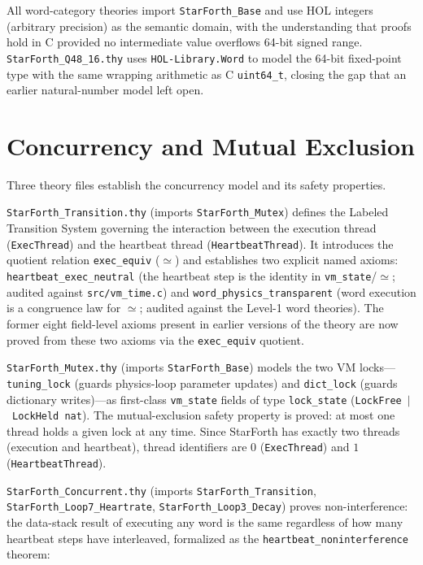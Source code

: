 All word-category theories import \texttt{StarForth\_Base} and use HOL
integers (arbitrary precision) as the semantic domain, with the understanding
that proofs hold in C provided no intermediate value overflows 64-bit signed
range. \texttt{StarForth\_Q48\_16.thy} uses \texttt{HOL-Library.Word} to model
the 64-bit fixed-point type with the same wrapping arithmetic as C
\texttt{uint64\_t}, closing the gap that an earlier natural-number model left
open.

\section{Concurrency and Mutual Exclusion}
\label{vol1:sec:proofs:concurrent}


Three theory files establish the concurrency model and its safety properties.

\texttt{StarForth\_Transition.thy} (imports \texttt{StarForth\_Mutex})
defines the Labeled Transition System governing the interaction between the
execution thread (\texttt{ExecThread}) and the heartbeat thread
(\texttt{HeartbeatThread}). It introduces the quotient relation
\texttt{exec\_equiv} ($\simeq$) and establishes two explicit named axioms:
\texttt{heartbeat\_exec\_neutral} (the heartbeat step is the identity in
\texttt{vm\_state}/$\simeq$; audited against \texttt{src/vm\_time.c}) and
\texttt{word\_physics\_transparent} (word execution is a congruence law for
$\simeq$; audited against the Level-1 word theories). The former eight
field-level axioms present in earlier versions of the theory are now proved
from these two axioms via the \texttt{exec\_equiv} quotient.

\texttt{StarForth\_Mutex.thy} (imports \texttt{StarForth\_Base}) models the
two VM locks---\texttt{tuning\_lock} (guards physics-loop parameter updates)
and \texttt{dict\_lock} (guards dictionary writes)---as first-class
\texttt{vm\_state} fields of type \texttt{lock\_state}
(\texttt{LockFree}~$|$~\texttt{LockHeld nat}). The mutual-exclusion safety
property is proved: at most one thread holds a given lock at any time. Since
StarForth has exactly two threads (execution and heartbeat), thread identifiers
are $0$ (\texttt{ExecThread}) and $1$ (\texttt{HeartbeatThread}).

\texttt{StarForth\_Concurrent.thy} (imports \texttt{StarForth\_Transition},
\texttt{StarForth\_Loop7\_Heartrate}, \texttt{StarForth\_Loop3\_Decay})
proves non-interference: the data-stack result of executing any word is the
same regardless of how many heartbeat steps have interleaved, formalized as
the \texttt{heartbeat\_noninterference} theorem:

